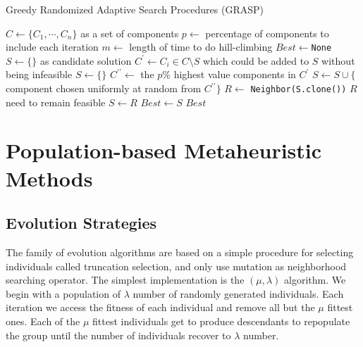             \begin{algorithm}[!htp]
                \centering
                \caption{Greedy Randomized Adaptive Search Procedures (GRASP)}
                \begin{algorithmic}[1]
                    \State $C \gets \{C_1, \cdots, C_n\}$ as a set of components
                    \State $p \gets$ percentage of components to include each iteration
                    \State $m \gets$ length of time to do hill-climbing
                    \State $Best \gets $\texttt{None}
                        \State $S \gets \{\}$ as candidate solution
                            \State $C^\prime \gets C_i \in C \setminus S$ which could be added to $S$ without being infeasible
                                \State $S \gets \{\}$
                            \Else
                                \State $C^{\prime\prime} \gets$ the $p\%$ highest value components in $C^\prime$
                                \State $S \gets S \cup \{$component chosen uniformly at random from $C^{\prime\prime}\}$
                            \EndIf
                        \EndWhile
                            \State $R \gets$ \texttt{Neighbor(S.clone())}
                            \Comment $R$ need to remain feasible
                                \State $S \gets R$
                            \EndIf
                        \EndFor
                            \State $Best \gets S$
                        \EndIf
                    \EndWhile
                    \State \Return $Best$
                \end{algorithmic}
            \end{algorithm}

    \section{Population-based Metaheuristic Methods}
        \subsection{Evolution Strategies}
            The family of evolution algorithms are based on a simple procedure for selecting individuals called truncation selection, and only use mutation as neighborhood searching operator. The simplest implementation is the $(\mu, \lambda)$ algorithm. We begin with a population of $\lambda$ number of randomly generated individuals. Each iteration we access the fitness of each individual and remove all but the $\mu$ fittest ones. Each of the $\mu$ fittest individuals get to produce descendants to repopulate the group until the number of individuals recover to $\lambda$ number.

